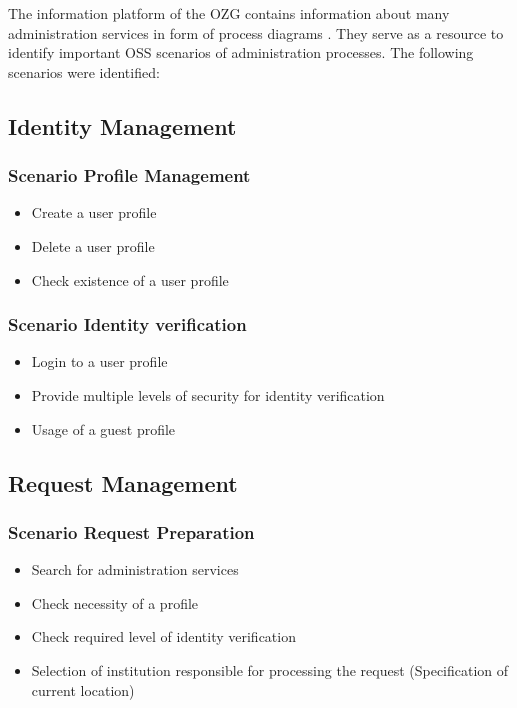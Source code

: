 \documentclass[
     12pt,         %
     a4paper,      %
     BCOR=10mm,version=first,     %
     DIV=14,version=first,        %
     ]{scrreprt}
\begin{document}
The information platform of the OZG contains information about many administration services in form of process diagrams \cite{BMI:Ergebnisse}. They serve as a resource to identify important OSS scenarios of administration processes. The following scenarios were identified:

\subsection{Identity Management}

\subsubsection{Scenario Profile Management}
\begin{itemize}
    \item Create a user profile
    \item Delete a user profile
    \item Check existence of a user profile
\end{itemize}

\subsubsection{Scenario Identity verification}
\begin{itemize}
    \item Login to a user profile
    \item Provide multiple levels of security for identity verification
    \item Usage of a guest profile
\end{itemize}

\subsection{Request Management}

\subsubsection{Scenario Request Preparation}
\begin{itemize}
    \item Search for administration services
    \item Check necessity of a profile
    \item Check required level of identity verification
    \item Selection of institution responsible for processing the request (Specification of current location)
\end{itemize}
\end{document}
